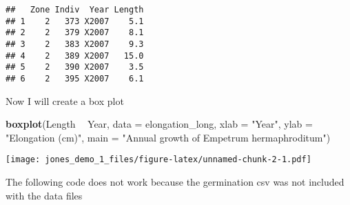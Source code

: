 \documentclass[
]{article}
\newenvironment{Shaded}{\begin{snugshade}}{\end{snugshade}}
\newcommand{\CommentTok}[1]{\textcolor[rgb]{0.56,0.35,0.01}{\textit{#1}}}
\newcommand{\DataTypeTok}[1]{\textcolor[rgb]{0.13,0.29,0.53}{#1}}
\newcommand{\KeywordTok}[1]{\textcolor[rgb]{0.13,0.29,0.53}{\textbf{#1}}}
\newcommand{\NormalTok}[1]{#1}
\newcommand{\OperatorTok}[1]{\textcolor[rgb]{0.81,0.36,0.00}{\textbf{#1}}}
\newcommand{\StringTok}[1]{\textcolor[rgb]{0.31,0.60,0.02}{#1}}
\begin{document}
\begin{verbatim}
##   Zone Indiv  Year Length
## 1    2   373 X2007    5.1
## 2    2   379 X2007    8.1
## 3    2   383 X2007    9.3
## 4    2   389 X2007   15.0
## 5    2   390 X2007    3.5
## 6    2   395 X2007    6.1
\end{verbatim}

Now I will create a box plot

\begin{Shaded}
\begin{Highlighting}[]
\KeywordTok{boxplot}\NormalTok{(Length }\OperatorTok{~}\StringTok{ }\NormalTok{Year, }
        \DataTypeTok{data =}\NormalTok{ elongation_long, }
        \DataTypeTok{xlab =} \StringTok{"Year"}\NormalTok{, }
        \DataTypeTok{ylab =} \StringTok{"Elongation (cm)"}\NormalTok{, }
        \DataTypeTok{main =} \StringTok{"Annual growth of Empetrum hermaphroditum"}\NormalTok{)}
\end{Highlighting}
\end{Shaded}

\texttt{[image: jones\_demo\_1\_files/figure-latex/unnamed-chunk-2-1.pdf]}

The following code does not work because the germination csv was not
included with the data files

\begin{Shaded}
\end{Shaded}
\end{document}
